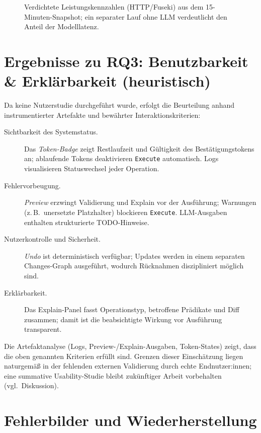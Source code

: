 \begin{figure}[ht]
\centering

\caption{Verdichtete Leistungskennzahlen (HTTP/Fuseki) aus dem 15-Minuten-Snapshot; ein separater Lauf ohne LLM verdeutlicht den Anteil der Modelllatenz.}
\label{fig:evaluation-metrics}
\end{figure}

\section{Ergebnisse zu RQ3: Benutzbarkeit \& Erklärbarkeit (heuristisch)}
\label{sec:ergebnisse-rq3}

Da keine Nutzerstudie durchgeführt wurde, erfolgt die Beurteilung anhand instrumentierter Artefakte und bewährter Interaktionskriterien:

\begin{description}
  \item[Sichtbarkeit des Systemstatus.] Das \emph{Token-Badge} zeigt Restlaufzeit und Gültigkeit des Bestätigungstokens an; ablaufende Tokens deaktivieren \texttt{Execute} automatisch. Logs visualisieren Statuswechsel jeder Operation.
  \item[Fehlervorbeugung.] \emph{Preview} erzwingt Validierung und Explain vor der Ausführung; Warnungen (z.\,B.\ unersetzte Platzhalter) blockieren \texttt{Execute}. LLM-Ausgaben enthalten strukturierte TODO-Hinweise.
  \item[Nutzerkontrolle und Sicherheit.] \emph{Undo} ist deterministisch verfügbar; Updates werden in einem separaten Changes-Graph ausgeführt, wodurch Rücknahmen diszipliniert möglich sind.
  \item[Erklärbarkeit.] Das Explain-Panel fasst Operationstyp, betroffene Prädikate und Diff zusammen; damit ist die beabsichtigte Wirkung vor Ausführung transparent.
\end{description}

Die Artefaktanalyse (Logs, Preview-/Explain-Ausgaben, Token-States) zeigt, dass die oben genannten Kriterien erfüllt sind. Grenzen dieser Einschätzung liegen naturgemäß in der fehlenden externen Validierung durch echte Endnutzer:innen; eine summative Usability-Studie bleibt zukünftiger Arbeit vorbehalten (vgl.\ Diskussion).

\section{Fehlerbilder und Wiederherstellung}
\label{sec:fehlerbilder}

